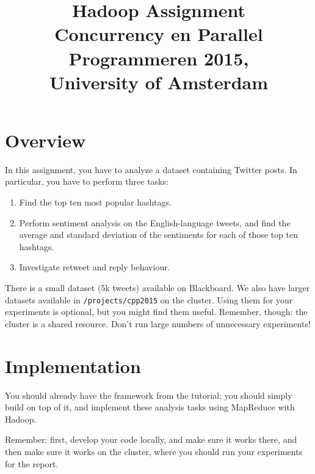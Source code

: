 \documentclass[a4paper,10pt]{article}
\date{}
\title{Hadoop Assignment\\
  Concurrency en Parallel Programmeren 2015,\\
  University of Amsterdam
}
\begin{document}
  \maketitle
  
  \tableofcontents
  
  \section{Overview}
  
  In this assignment, you have to analyze a dataset containing Twitter posts. In particular, you have to perform three tasks:

  \begin{enumerate}
    \item Find the top ten most popular hashtags.
    \item Perform sentiment analysis on the English-language tweets, and find the average and standard deviation of the sentiments for each of those top ten hashtags.
    \item Investigate retweet and reply behaviour.
  \end{enumerate}

  There is a small dataset (5k tweets) available on Blackboard. We also have larger datasets available in \texttt{/projects/cpp2015} on the cluster. Using them for your experiments is optional, but you might find them useful. Remember, though: the cluster is a shared resource. Don't run large numbers of unnecessary experiments!
 
  \section{Implementation}

  You should already have the framework from the tutorial; you should simply build on top of it, and implement these analysis tasks using MapReduce with Hadoop.
  
  Remember: first, develop your code locally, and make sure it works there, and then make sure it works on the cluster, where you should run your experiments
  for the report.
  
\end{document}
